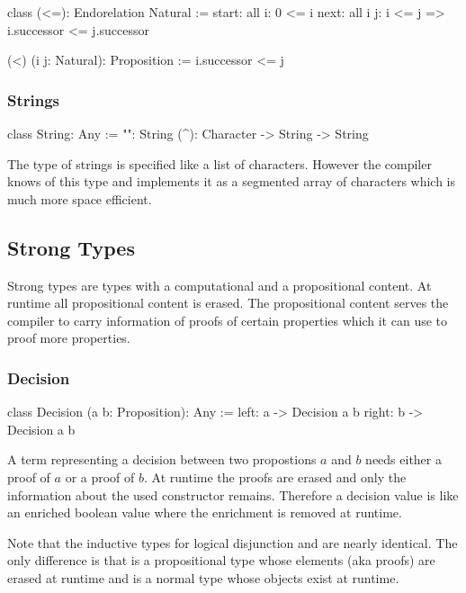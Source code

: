 \begin{alba}
  class
    (<=): Endorelation Natural
  :=
    start: all i: 0 <= i
    next:  all i j: i <= j => i.successor <= j.successor

  (<) (i j: Natural): Proposition := i.successor <= j
\end{alba}
\vskip 2mm


\subsubsection{Strings}

\begin{alba}
  class
    String: Any
  :=
    "": String
    (^): Character -> String -> String
\end{alba}

The type of strings is specified like a list of characters. However the
compiler knows of this type and implements it as a segmented array of
characters which is much more space efficient.
\newline




\subsection{Strong Types}
\label{sec:prelude-strong-types}

Strong types are types with a computational and a propositional content. At
runtime all propositional content is erased. The propositional content serves
the compiler to carry information of proofs of certain properties which it can
use to proof more properties.


\subsubsection{Decision}
%
\begin{alba}
  class
    Decision (a b: Proposition): Any
  :=
    left:  a -> Decision a b
    right: b -> Decision a b
\end{alba}

A term representing a decision between two propostions $a$ and $b$ needs
either a proof of $a$ or a proof of $b$. At runtime the proofs are erased and
only the information about the used constructor remains. Therefore a decision
value is like an enriched boolean value where the enrichment is removed at
runtime.

Note that the inductive types  for logical disjunction and
 are nearly identical. The only difference is that  is
a propositional type whose elements (aka proofs) are erased at runtime and
 is a normal type whose objects exist at runtime.
\newline





